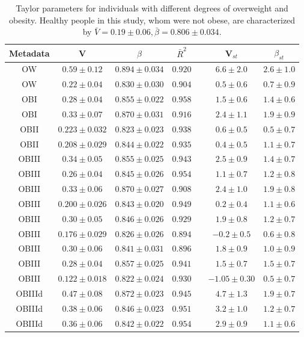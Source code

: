 \documentclass[12pt,oneside,letterpaper]{article}
\begin{document}
\begin{table} 
  \begin{center}
    \begin{tabular}{ccccccc}
	    \hline
		Metadata&V&$\beta$&$\bar{R}^2$&&V$_{st}$&$\beta_{st}$\\
		\hline
		OW&$0.59 \pm 0.12$&$0.894 \pm 0.034$&$0.920$&&$6.6 \pm 2.0$&$2.6 \pm 1.0$\\
		OW&$0.22 \pm 0.04$&$0.830 \pm 0.030$&$0.904$&&$0.5 \pm 0.6$&$0.7 \pm 0.9$\\
		\hline
		OBI&$0.28 \pm 0.04$&$0.855 \pm 0.022$&$0.958$&&$1.5 \pm 0.6$&$1.4 \pm 0.6$\\
		OBI&$0.33 \pm 0.07$&$0.870 \pm 0.031$&$0.916$&&$2.4 \pm 1.1$&$1.9 \pm 0.9$\\
		\hline
		OBII&$0.223 \pm 0.032$&$0.823 \pm 0.023$&$0.938$&&$0.6 \pm 0.5$&$0.5 \pm 0.7$\\
		OBII&$0.208 \pm 0.029$&$0.844 \pm 0.022$&$0.935$&&$0.4 \pm 0.5$&$1.1 \pm 0.7$\\
		\hline
		OBIII&$0.34 \pm 0.05$&$0.855 \pm 0.025$&$0.943$&&$2.5 \pm 0.9$&$1.4 \pm 0.7$\\
		OBIII&$0.26 \pm 0.04$&$0.845 \pm 0.026$&$0.954$&&$1.1 \pm 0.7$&$1.2 \pm 0.8$\\
		OBIII&$0.33 \pm 0.06$&$0.870 \pm 0.027$&$0.908$&&$2.4 \pm 1.0$&$1.9 \pm 0.8$\\
		OBIII&$0.200 \pm 0.026$&$0.843 \pm 0.020$&$0.949$&&$0.2 \pm 0.4$&$1.1 \pm 0.6$\\
		OBIII&$0.30 \pm 0.05$&$0.846 \pm 0.026$&$0.929$&&$1.9 \pm 0.8$&$1.2 \pm 0.7$\\
		OBIII&$0.176 \pm 0.029$&$0.826 \pm 0.026$&$0.894$&&$-0.2 \pm 0.5$&$0.6 \pm 0.8$\\
		OBIII&$0.30 \pm 0.06$&$0.841 \pm 0.031$&$0.896$&&$1.8 \pm 0.9$&$1.0 \pm 0.9$\\
		OBIII&$0.28 \pm 0.04$&$0.857 \pm 0.025$&$0.941$&&$1.5 \pm 0.7$&$1.5 \pm 0.7$\\
		OBIII&$0.122 \pm 0.018$&$0.822 \pm 0.024$&$0.930$&&$-1.05 \pm 0.30$&$0.5 \pm 0.7$\\
		\hline
		OBIIId&$0.47 \pm 0.08$&$0.872 \pm 0.023$&$0.945$&&$4.7 \pm 1.3$&$1.9 \pm 0.7$\\
		OBIIId&$0.38 \pm 0.06$&$0.846 \pm 0.023$&$0.951$&&$3.2 \pm 1.0$&$1.2 \pm 0.7$\\
		OBIIId&$0.36 \pm 0.06$&$0.842 \pm 0.022$&$0.954$&&$2.9 \pm 0.9$&$1.1 \pm 0.6$\\
	    \hline
	    \hline
    \end{tabular}
  \end{center}
  \caption{Taylor parameters for individuals with different degrees of overweight and obesity\cite{LEA}. Healthy people in this study, whom were not obese, are characterized by $\bar{V} = 0.19 \pm 0.06, \bar{\beta} = 0.806 \pm 0.034$.}
  \label{tab:LEA}
\end{table}
\end{document}
